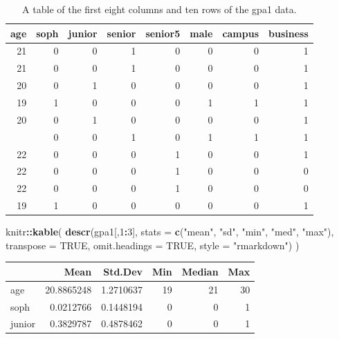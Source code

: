 \documentclass[]{book}
\newenvironment{Shaded}{\begin{snugshade}}{\end{snugshade}}
\newcommand{\DataTypeTok}[1]{\textcolor[rgb]{0.13,0.29,0.53}{#1}}
\newcommand{\DecValTok}[1]{\textcolor[rgb]{0.00,0.00,0.81}{#1}}
\newcommand{\KeywordTok}[1]{\textcolor[rgb]{0.13,0.29,0.53}{\textbf{#1}}}
\newcommand{\NormalTok}[1]{#1}
\newcommand{\OperatorTok}[1]{\textcolor[rgb]{0.81,0.36,0.00}{\textbf{#1}}}
\newcommand{\OtherTok}[1]{\textcolor[rgb]{0.56,0.35,0.01}{#1}}
\newcommand{\StringTok}[1]{\textcolor[rgb]{0.31,0.60,0.02}{#1}}
\begin{document}
\begin{table}

\caption{\label{tab:unnamed-chunk-81}A table of the first eight columns and ten rows of the gpa1 data.}
\centering
\begin{tabular}[t]{rrrrrrrr}
\toprule
age & soph & junior & senior & senior5 & male & campus & business\\
\midrule
21 & 0 & 0 & 1 & 0 & 0 & 0 & 1\\
21 & 0 & 0 & 1 & 0 & 0 & 0 & 1\\
20 & 0 & 1 & 0 & 0 & 0 & 0 & 1\\
19 & 1 & 0 & 0 & 0 & 1 & 1 & 1\\
20 & 0 & 1 & 0 & 0 & 0 & 0 & 1\\
\addlinespace
20 & 0 & 0 & 1 & 0 & 1 & 1 & 1\\
22 & 0 & 0 & 0 & 1 & 0 & 0 & 1\\
22 & 0 & 0 & 0 & 1 & 0 & 0 & 0\\
22 & 0 & 0 & 0 & 1 & 0 & 0 & 0\\
19 & 1 & 0 & 0 & 0 & 0 & 0 & 1\\
\bottomrule
\end{tabular}
\end{table}

\begin{Shaded}
\begin{Highlighting}[]
\NormalTok{knitr}\OperatorTok{::}\KeywordTok{kable}\NormalTok{(}
  \KeywordTok{descr}\NormalTok{(gpa1[,}\DecValTok{1}\OperatorTok{:}\DecValTok{3}\NormalTok{], }\DataTypeTok{stats =} \KeywordTok{c}\NormalTok{(}\StringTok{"mean"}\NormalTok{, }\StringTok{"sd"}\NormalTok{, }\StringTok{"min"}\NormalTok{, }\StringTok{"med"}\NormalTok{, }\StringTok{"max"}\NormalTok{), }\DataTypeTok{transpose =} \OtherTok{TRUE}\NormalTok{, }
        \DataTypeTok{omit.headings =} \OtherTok{TRUE}\NormalTok{, }\DataTypeTok{style =} \StringTok{"rmarkdown"}\NormalTok{)}
\NormalTok{)}
\end{Highlighting}
\end{Shaded}

\begin{tabular}{l|r|r|r|r|r}
\hline
  & Mean & Std.Dev & Min & Median & Max\\
\hline
age & 20.8865248 & 1.2710637 & 19 & 21 & 30\\
\hline
soph & 0.0212766 & 0.1448194 & 0 & 0 & 1\\
\hline
junior & 0.3829787 & 0.4878462 & 0 & 0 & 1\\
\hline
\end{tabular}
\end{document}
